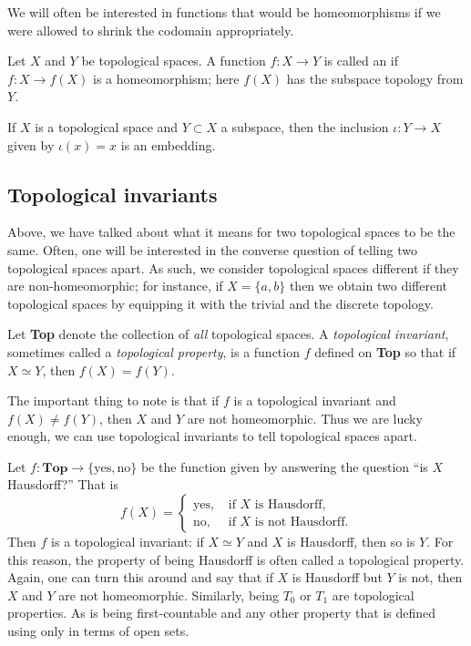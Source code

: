 We will often be interested in functions that would be homeomorphisms if we were allowed to shrink the codomain appropriately.
\begin{defn}
  Let $X$ and $Y$ be topological spaces. A function $f: X \to Y$ is called an  if $f : X \to f(X)$ is a homeomorphism; here $f(X)$ has the subspace topology from $Y$.
\end{defn}
\begin{example}
  If $X$ is a topological space and $Y \subset X$ a subspace, then the inclusion $\iota : Y \to X$ given by $\iota(x) = x$ is an embedding.
\end{example}

\subsection{Topological invariants}
Above, we have talked about what it means for two topological spaces to be the same. Often, one will be interested in the converse question of telling two topological spaces apart. As such, we consider topological spaces different if they are non-homeomorphic; for instance, if $X = \{a,b\}$ then we obtain two different topological spaces by equipping it with the trivial and the discrete topology.

\begin{defn}
  Let \textbf{Top} denote the collection of \emph{all} topological spaces. A \emph{topological invariant}, sometimes called a \emph{topological property}, is a function $f$ defined on \textbf{Top} so that if $X \simeq Y$, then $f(X) = f(Y)$.
\end{defn}
The important thing to note is that if $f$ is a topological invariant and $f(X) \not= f(Y)$, then $X$ and $Y$ are not homeomorphic. Thus we are lucky enough, we can use topological invariants to tell topological spaces apart.
\begin{example}
  Let $f : \textbf{Top} \to \{ \text{yes}, \text{no} \}$ be the function given by answering the question ``is $X$ Hausdorff?'' That is
  \[
    f(X) = \begin{cases} \text{yes}, &\text{ if $X$ is Hausdorff,}\\ \text{no}, &\text{ if $X$ is not Hausdorff.} \end{cases}
  \]
  Then $f$ is a topological invariant: if $X \simeq Y$ and $X$ is Hausdorff, then so is $Y$. For this reason, the property of being Hausdorff is often called a topological property. Again, one can turn this around and say that if $X$ is Hausdorff but $Y$ is not, then $X$ and $Y$ are not homeomorphic. Similarly, being $T_0$ or $T_1$ are topological properties. As is being first-countable and any other property that is defined using only in terms of open sets.
\end{example}

